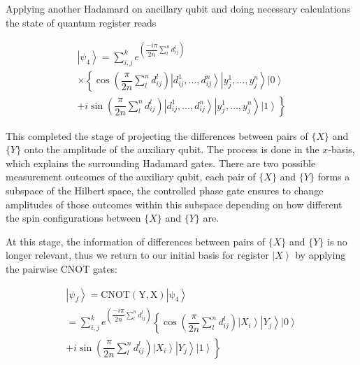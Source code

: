 \documentclass[pra,showkeys,twocolumn,showpacs]{revtex4-1}
\begin{document}


Applying another Hadamard on ancillary qubit and doing necessary calculations the state of quantum register reads

\begin{multline}
    \left| \psi_4 \right\rangle = 
    \sum\limits_{i, j}^{k} 
    e^{\left(\dfrac{-i \pi}{2n}\sum\limits_l^n d^l_{ij} \right)}
		\\ \times
        \left\{\cos\left(\dfrac{\pi}{2n}\sum\limits_l^n d^l_{ij} \right)
        \left| d^1_{ij}, \dots, d^n_{ij} \right\rangle 
        \left| y^1_j, \dots, y^n_j \right\rangle 
        \left| 0 \right\rangle\right.
        \\+ 
        \left. i \sin\left(\dfrac{\pi}{2n}\sum\limits_l^n d^l_{ij} \right)
        \left| d^1_{ij}, \dots, d^n_{ij} \right\rangle 
        \left| y^1_j, \dots, y^n_j \right\rangle 
        \left| 1 \right\rangle\right\}
\end{multline}


This completed the stage of projecting the differences between pairs of $\{X\}$ and $\{Y\}$ onto the amplitude of the auxiliary qubit. The process is done in the $x$-basis, which explains the surrounding Hadamard gates. There are two possible measurement outcomes of the auxiliary qubit, each pair of $\{X\}$ and $\{Y\}$ forms a subspace of the Hilbert space, the controlled phase gate ensures to change amplitudes of those outcomes within this subspace depending on how different the spin configurations between $\{X\}$ and $\{Y\}$ are.

At this stage, the information of differences between pairs of $\{X\}$ and $\{Y\}$ is no longer relevant, thus we return to our initial basis for register $\left| X \right\rangle$ by applying the pairwise CNOT gates:

\begin{multline}
    \left| \psi_f \right\rangle = 
    \mathrm{CNOT(Y,X)\left| \psi_4 \right\rangle} \\=  
    \sum\limits_{i, j}^{k} 
    e^{\left(\dfrac{-i \pi}{2n}\sum\limits_l^n d^l_{ij} \right)}
				\left\{\cos\left(\dfrac{\pi}{2n}\sum\limits_l^n d^l_{ij} \right)
        \left| X_i \right\rangle 
        \left| Y_j \right\rangle 
        \left| 0 \right\rangle\right.
        \\+
        \left. i \sin\left(\dfrac{\pi}{2n}\sum\limits_l^n d^l_{ij} \right)
        \left| X_i \right\rangle 
        \left| Y_j \right\rangle 
        \left| 1 \right\rangle\right\}
\end{multline}
\end{document}
